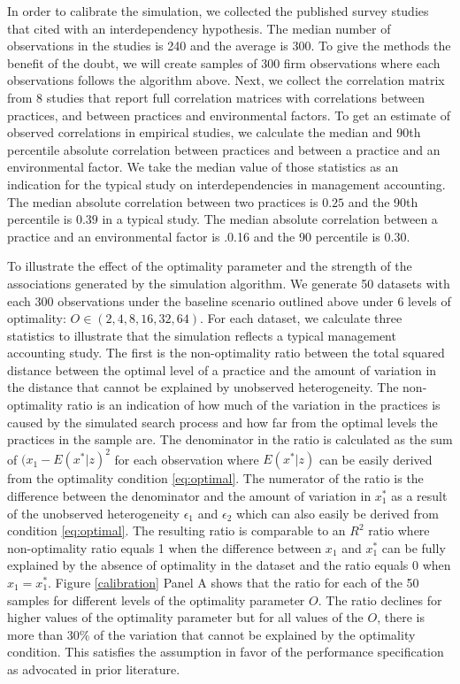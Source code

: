 \documentclass[12pt]{article}
\begin{document}
In order to calibrate the simulation, we collected the published survey studies that cited \citet{Grabner2013} with an interdependency hypothesis. The median number of observations in the studies is 240 and the average is 300. To give the methods the benefit of the doubt, we will create samples of 300 firm observations where each observations follows the algorithm above. Next, we collect the correlation matrix from 8 studies \citep{Dekker2016, Grabner2016, Bedford2015, Heinicke2016,Bedford2018PerformanceFirms, Abernethy2015a,Sponem2016ExploringApproach, Samagaio2018ManagementInvestigation} that report full correlation matrices with correlations between practices, and between practices and environmental factors. To get an estimate of observed correlations in empirical studies, we calculate the median and 90th percentile absolute correlation between practices and between a practice and an environmental factor. We take the median value of those statistics as an indication for the typical study on interdependencies in management accounting. The median absolute correlation between two practices is $0.25$ and the 90th percentile is $0.39$ in a typical study. The median absolute correlation between a practice and an environmental factor is .0.16 and the 90 percentile is $0.30$.

To illustrate the effect of the optimality parameter and the strength of the associations generated by the simulation algorithm. We generate 50 datasets with each 300 observations under the baseline scenario outlined above under 6 levels of optimality: $O \in  (2, 4, 8, 16, 32, 64)$. For each dataset, we calculate three statistics to illustrate that the simulation reflects a typical management accounting study. The first is the non-optimality ratio between the total squared distance between the optimal level of a practice and the amount of variation in the distance that cannot be explained by unobserved heterogeneity. The non-optimality ratio is an indication of how much of the variation in the practices is caused by the simulated search process and how far from the optimal levels the practices in the sample are. The denominator in the ratio is calculated as the sum of $(x_1 - E(x^*|z)^2$ for each observation where $E(x^*|z)$ can be easily derived from the optimality condition \eqref{eq:optimal}. The numerator of the ratio is the difference between the denominator and the amount of variation in $x^*_1$ as a result of the unobserved heterogeneity $\epsilon_1$ and $\epsilon_2$ which can also easily be derived from condition \eqref{eq:optimal}. The resulting ratio is comparable to an $R^2$ ratio where non-optimality ratio equals 1 when the difference between $x_1$ and $x^*_1$ can be fully explained by the absence of optimality in the dataset and the ratio equals 0 when $x_1 = x^*_1$. Figure \ref{calibration} Panel A shows that the ratio for each of the 50 samples for different levels of the optimality parameter $O$. The ratio declines for higher values of the optimality parameter but for all values of the $O$, there is more than $30\%$ of the variation that cannot be explained by the optimality condition. This satisfies the assumption in favor of the performance specification as advocated in prior literature.
\end{document}
